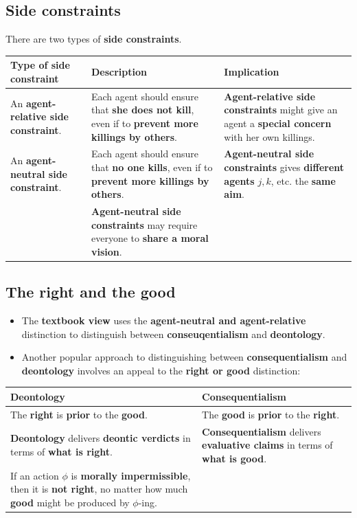 \documentclass[11pt]{article}
\begin{document}
 \newpage
\subsection{Side constraints}
\label{sec:org041305b}
There are two types of \textbf{side constraints}.
\begin{center}
\begin{tabularx}{\textwidth}{|X|X|X|}
\hline
Type of side constraint & Description & Implication\\
\hline
An \textbf{agent-relative side constraint}. & Each agent should ensure that \textbf{she does not kill}, even if to \textbf{prevent more killings by others}. & \textbf{Agent-relative side constraints} might give an agent a \textbf{special concern} with her own killings.\\
\hline
An \textbf{agent-neutral side constraint}. & Each agent should ensure that \textbf{no one kills}, even if to \textbf{prevent more killings by others}. & \textbf{Agent-neutral side constraints} gives \textbf{different agents} \(j, k\), etc. the \textbf{same aim}.\\
 & \textbf{Agent-neutral side constraints} may require everyone to \textbf{share a moral vision}. & \\
\hline
\end{tabularx}
\end{center}
\subsection{The right and the good}
\label{sec:org978aae0}
\begin{itemize}
\item The \textbf{textbook view} uses the \textbf{agent-neutral and agent-relative} distinction to distinguish between \textbf{conseuqentialism} and \textbf{deontology}.
\item Another popular approach to distinguishing between \textbf{consequentialism} and \textbf{deontology} involves an appeal to the \textbf{right or good} distinction:
\end{itemize}
\begin{center}
\begin{tabularx}{\textwidth}{|X|X|}
\hline
Deontology & Consequentialism\\
\hline
The \textbf{right} is \textbf{prior} to the \textbf{good}. & The \textbf{good} is \textbf{prior} to the \textbf{right}.\\
\hline
\textbf{Deontology} delivers \textbf{deontic verdicts} in terms of \textbf{what is right}. & \textbf{Consequentialism} delivers \textbf{evaluative claims} in terms of \textbf{what is good}.\\
If an action \(\phi\) is \textbf{morally impermissible}, then it is \textbf{not right}, no matter how much \textbf{good} might be produced by \(\phi\)-ing. & \\
\hline
\end{tabularx}
\end{center}
\end{document}
